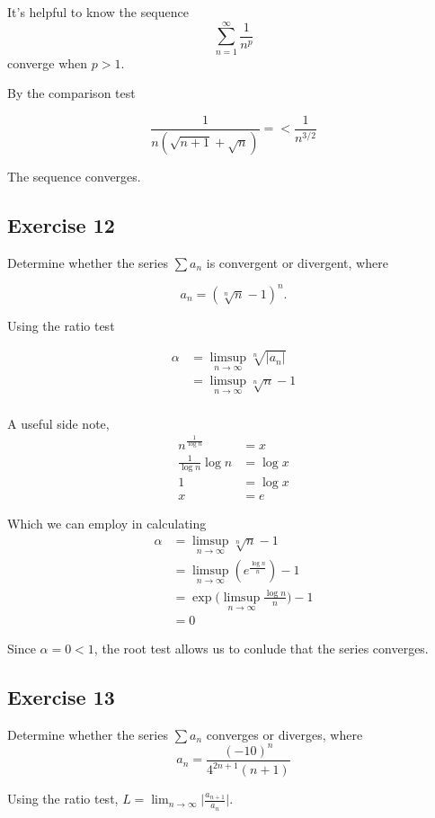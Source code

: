 \documentclass{tufte-book}
\theoremstyle{mytheoremstyle}
\theoremstyle{mylemstyle}
\theoremstyle{mydefstyle}
\begin{document}
It's helpful to know the sequence 
\[ \sum_{n=1}^{\infty} \frac{1}{n^p} \]
converge when $p > 1$.

By the comparison test

\[ \frac{1}{n(\sqrt{n+1} + \sqrt{n})} = < \frac{1}{n^{3/2}} \]

The sequence converges.

\subsection{Exercise 12}

Determine whether the series $\sum a_n$ is convergent or divergent, where

\[ a_n = (\sqrt[n]{n} - 1)^n .\]

Using the ratio test

\begin{align*}
\alpha &= \limsup_{n \to \infty} \sqrt[n]{|a_n|} \\
&= \limsup_{n \to \infty} \sqrt[n]{n} - 1\\
\end{align*}

A useful side note,
\begin{align*}
n^{\frac{1}{\log n}} &= x \\
\frac{1}{\log n} \log n &= \log x\\
1 &= \log x\\
x &= e
\end{align*}

Which we can employ in calculating
\begin{align*}
\alpha &= \limsup_{n \to \infty} \sqrt[n]{n} - 1\\
&= \limsup_{n \to \infty} (e^{\frac{\log n}{n}}) - 1\\
&= \exp\big(\limsup_{n \to \infty} \frac{\log n}{n} \big) - 1 \\
&= 0
\end{align*}

Since $\alpha = 0 < 1$, the root test allows us to conlude that the series converges.

\subsection{Exercise 13}
Determine whether the series $\sum a_n$ converges or diverges, where
\[ a_n = \frac{(-10)^n}{4^{2n+1}(n+1)} \]

Using the ratio test, $L = \lim_{n \to \infty} \big| \frac{a_{n+1}}{a_n} \big|$.
\end{document}

